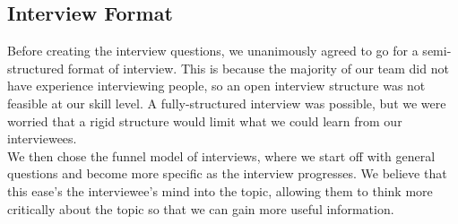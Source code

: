 \documentclass[11pt,onside]{report}
\begin{document}
\subsection{Interview Format}
Before creating the interview questions, we unanimously agreed to go for a semi-structured format of interview. This is because the majority of our team did not have experience interviewing people, so an open interview structure was not feasible at our skill level. A fully-structured interview was possible, but we were worried that a rigid structure would limit what we could learn from our interviewees. \\

We then chose the funnel model of interviews, where we start off with general questions and become more specific as the interview progresses. We believe that this ease's the interviewee's mind into the topic, allowing them to think more critically about the topic so that we can gain more useful information.
\end{document}
